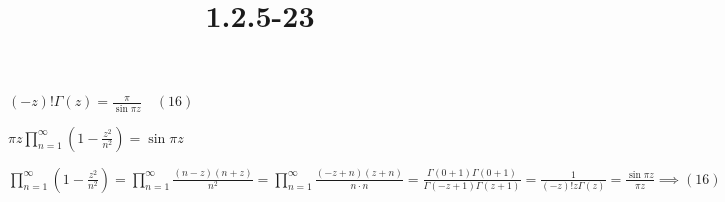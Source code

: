 \documentclass{article}
\title{1.2.5-23}
\begin{document}
\maketitle

$(-z)! \Gamma(z) = \frac{\pi}{\sin \pi z}\quad (16)$

$\pi z \prod_{n=1}^\infty (1- \frac{z^2}{n^2}) = \sin \pi z$

$\prod_{n=1}^\infty (1- \frac{z^2}{n^2}) = \prod_{n=1}^\infty \frac{(n-z)(n+z)}{n^2} = \prod_{n=1}^\infty \frac{(-z+n)(z+n)}{n \cdot n} = \frac{\Gamma(0+1)\Gamma(0+1)}{\Gamma(-z+1)\Gamma(z+1)} = \frac{1}{(-z)!z \Gamma(z)} = \frac{\sin \pi z}{\pi z} \implies (16)$
\end{document}
